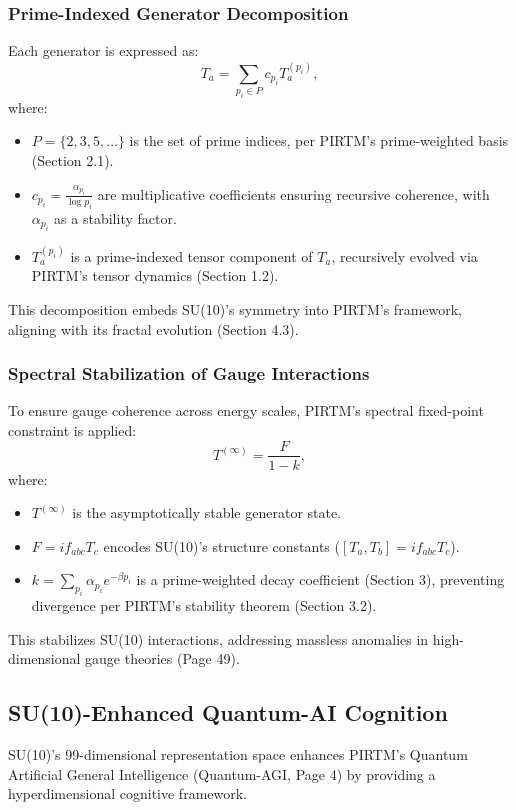 \documentclass{article}
\theoremstyle{plain}
\begin{document}
\subsubsection{Prime-Indexed Generator Decomposition}
Each generator is expressed as:
\[
T_a = \sum_{p_i \in P} c_{p_i} T_a^{(p_i)},
\]
where:
\begin{itemize}
    \item \( P = \{2, 3, 5, \dots\} \) is the set of prime indices, per PIRTM’s prime-weighted basis (Section 2.1).
    \item \( c_{p_i} = \frac{\alpha_{p_i}}{\log p_i} \) are multiplicative coefficients ensuring recursive coherence, with \( \alpha_{p_i} \) as a stability factor.
    \item \( T_a^{(p_i)} \) is a prime-indexed tensor component of \( T_a \), recursively evolved via PIRTM’s tensor dynamics (Section 1.2).
\end{itemize}
This decomposition embeds SU(10)’s symmetry into PIRTM’s framework, aligning with its fractal evolution (Section 4.3).

\subsubsection{Spectral Stabilization of Gauge Interactions}
To ensure gauge coherence across energy scales, PIRTM’s spectral fixed-point constraint is applied:
\[
T^{(\infty)} = \frac{F}{1 - k},
\]
where:
\begin{itemize}
    \item \( T^{(\infty)} \) is the asymptotically stable generator state.
    \item \( F = i f_{abc} T_c \) encodes SU(10)’s structure constants (\( [T_a, T_b] = i f_{abc} T_c \)).
    \item \( k = \sum_{p_i} \alpha_{p_i} e^{-\beta p_i} \) is a prime-weighted decay coefficient (Section 3), preventing divergence per PIRTM’s stability theorem (Section 3.2).
\end{itemize}
This stabilizes SU(10) interactions, addressing massless anomalies in high-dimensional gauge theories (Page 49).

\subsection{SU(10)-Enhanced Quantum-AI Cognition}

SU(10)’s 99-dimensional representation space enhances PIRTM’s Quantum Artificial General Intelligence (Quantum-AGI, Page 4) by providing a hyperdimensional cognitive framework.
\end{document}

